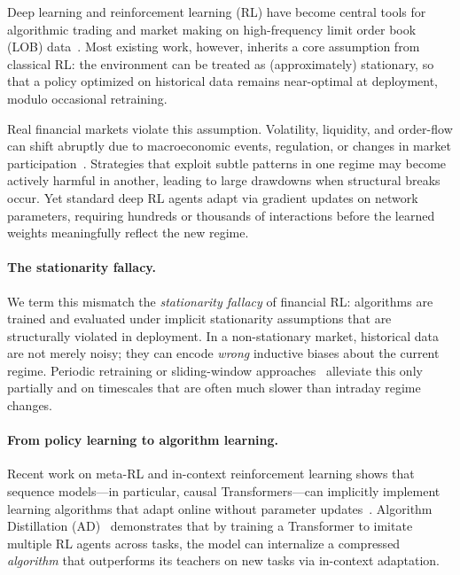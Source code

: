 \documentclass{article}
\begin{document}
Deep learning and reinforcement learning (RL) have become central tools for algorithmic trading and market making on high-frequency limit order book (LOB) data~\citep{zhang2019deeplob,zhang2019deeptrading,spooner2018market}. Most existing work, however, inherits a core assumption from classical RL: the environment can be treated as (approximately) stationary, so that a policy optimized on historical data remains near-optimal at deployment, modulo occasional retraining. 

Real financial markets violate this assumption. Volatility, liquidity, and order-flow can shift abruptly due to macroeconomic events, regulation, or changes in market participation~\citep{sirignano2019universal,cartea2015algorithmic}. Strategies that exploit subtle patterns in one regime may become actively harmful in another, leading to large drawdowns when structural breaks occur. Yet standard deep RL agents adapt via gradient updates on network parameters, requiring hundreds or thousands of interactions before the learned weights meaningfully reflect the new regime.

\paragraph{The stationarity fallacy.}
We term this mismatch the \emph{stationarity fallacy} of financial RL: algorithms are trained and evaluated under implicit stationarity assumptions that are structurally violated in deployment. In a non-stationary market, historical data are not merely noisy; they can encode \emph{wrong} inductive biases about the current regime. Periodic retraining or sliding-window approaches~\citep{padakandla2021survey} alleviate this only partially and on timescales that are often much slower than intraday regime changes.

\paragraph{From policy learning to algorithm learning.}
Recent work on meta-RL and in-context reinforcement learning shows that sequence models---in particular, causal Transformers---can implicitly implement learning algorithms that adapt online without parameter updates~\citep{duan2016rl2,finn2017maml,laskin2023context,garg2022what}. Algorithm Distillation (AD)~\citep{laskin2023context} demonstrates that by training a Transformer to imitate multiple RL agents across tasks, the model can internalize a compressed \emph{algorithm} that outperforms its teachers on new tasks via in-context adaptation.
\end{document}
